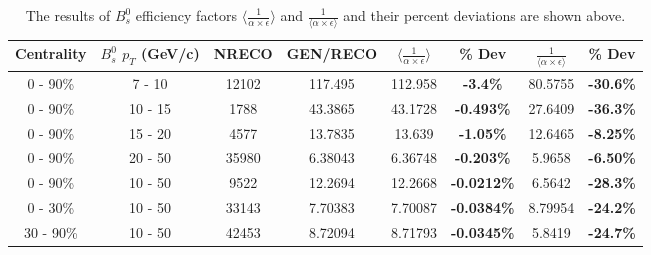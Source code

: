 \begin{table}[h]
\begin{center}
\caption{The results of $B^0_s$ efficiency factors $\langle \frac{1}{\alpha \times \epsilon} \rangle$ and $\frac{1}{\langle \alpha \times \epsilon \rangle}$ and their percent deviations are shown above.}
\vspace{1em}
\label{BsHighStat}
  \begin{tabular}{| c | c |c |c |c | c |  c| c|}
    \hline
     Centrality &  $B^0_s$  $p_T$ (GeV/c) & NRECO & GEN/RECO &  $\langle \frac{1}{\alpha \times \epsilon} \rangle$  & \% Dev & $\frac{1}{\langle \alpha \times \epsilon \rangle}$ &  \% Dev \\
    \hline
    \hline
0 - 90\% & 7 - 10 & 12102 & 117.495 & 112.958 & \textbf{-3.4\% }& 80.5755 &  \textbf{-30.6\% }   \\ 
0 - 90\% & 10 - 15 & 1788 & 43.3865 & 43.1728 & \textbf{-0.493\% }& 27.6409 &  \textbf{-36.3\% }   \\ 
0 - 90\% & 15 - 20 & 4577 & 13.7835 & 13.639 & \textbf{-1.05\% }& 12.6465 &  \textbf{-8.25\% }   \\ 
0 - 90\% & 20 - 50 & 35980 & 6.38043 & 6.36748 & \textbf{-0.203\% }& 5.9658 &  \textbf{-6.50\% }   \\ 
0 - 90\% & 10 - 50 & 9522 & 12.2694 & 12.2668 & \textbf{-0.0212\% }& 6.5642 &  \textbf{-28.3\% }   \\ 
0 - 30\% & 10 - 50 & 33143 & 7.70383 & 7.70087 & \textbf{-0.0384\% }& 8.79954 &  \textbf{-24.2\% }   \\ 
30 - 90\% & 10 - 50 & 42453 & 8.72094 & 8.71793 & \textbf{-0.0345\% }& 5.8419 &  \textbf{-24.7\% }   \\ 
    \hline
    \hline
\end{tabular}
\end{center}
\end{table}


